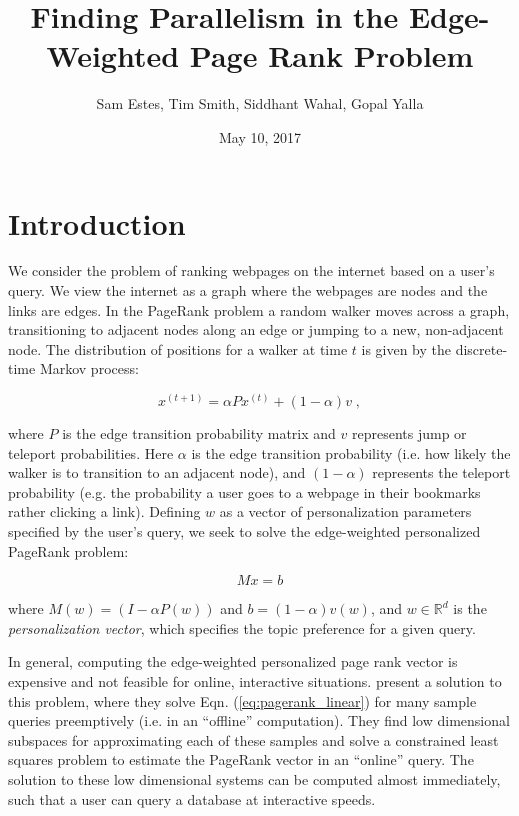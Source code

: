 \documentclass[11pt]{article}
\title{Finding Parallelism in the Edge-Weighted Page Rank Problem}
\author{Sam Estes, Tim Smith, Siddhant Wahal, Gopal Yalla}
\date{May 10, 2017}
\newcommand{\noi}{\noindent}
\begin{document}
\maketitle


\section{Introduction}

We consider the problem of ranking webpages on the internet based on a user's
query. We view the internet as a graph where the webpages are nodes and the
links are edges. 
In the PageRank problem a random walker moves across a graph, transitioning to
adjacent nodes along an edge or jumping to a new, non-adjacent node. The
distribution of positions for a walker at time $t$ is given by the discrete-time
Markov process: 

\begin{equation}
        x^{(t+1)}=\alpha P x^{(t)} + (1-\alpha) v \; ,
\label{eq:pagerank_markov}
\end{equation}

\noi where $P$ is the edge transition probability matrix and $v$ represents jump or
teleport probabilities. Here $\alpha$ is the edge
transition probability (i.e. how likely the walker is to transition to an
adjacent node), and $(1-\alpha)$ represents the teleport probability (e.g. the
probability a user goes to a webpage in their bookmarks rather clicking a link).
Defining $w$ as a vector of personalization parameters specified by the user's
query, we seek to solve the
edge-weighted personalized PageRank problem: 

\begin{equation}
        Mx=b
\label{eq:pagerank_linear}
\end{equation}

\noi where $M(w) = (I-\alpha P(w))$ and $b = (1-\alpha)v(w)$, and $w \in
\mathbb{R}^d$ is
the \textit{personalization vector}, which specifies the topic preference for
a given query. 

In general, computing the edge-weighted personalized page rank vector is expensive
and not feasible for online, interactive situations. \cite{xie} present a
solution to this problem, where they solve Eqn. (\ref{eq:pagerank_linear}) for many
sample queries preemptively (i.e. in an ``offline'' computation). They find low
dimensional subspaces for
approximating each of these samples and solve a constrained least squares
problem to estimate the PageRank vector in an ``online'' query. The solution to
these low dimensional systems can be computed almost immediately, such that
a user can query a database at interactive speeds.   
\end{document}
